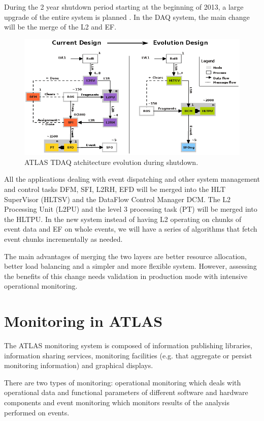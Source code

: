 During the 2 year shutdown period starting at the beginning of 2013, a large upgrade of the entire system is planned \citep{hauser2012atlas}. In the DAQ system, the main change will be the merge of the L2 and EF.  

\begin{figure}[ht!]
\centering
\includegraphics[scale=0.55]{Images/Evolution.png}
\caption{ATLAS TDAQ atchitecture evolution during shutdown.}
\end{figure}

All the applications dealing with event dispatching and other system management and control tasks DFM, SFI, L2RH, EFD will be merged into the HLT SuperVisor (HLTSV) and the DataFlow Control Manager DCM. 
The L2 Processing Unit (L2PU) and the level 3 processing task (PT) will be merged into the HLTPU. In the new system instead of having L2 operating on chunks of event data and EF on whole events, we will have a series of algorithms that fetch event chunks incrementally as needed.

The main advantages of merging the two layers are better resource allocation, better load balancing and a simpler and more flexible system. However, assessing the benefits of this change needs validation in production mode with intensive operational monitoring.

\section*{Monitoring in ATLAS}

The ATLAS monitoring system \citep{collaboration2003atlas} is composed of information publishing libraries, information sharing services, monitoring facilities (e.g. that aggregate or persist monitoring information) and graphical displays.

There are two types of monitoring: operational monitoring which deals with operational data and functional parameters of different software and hardware components and event monitoring which monitors results of the analysis performed on events.

